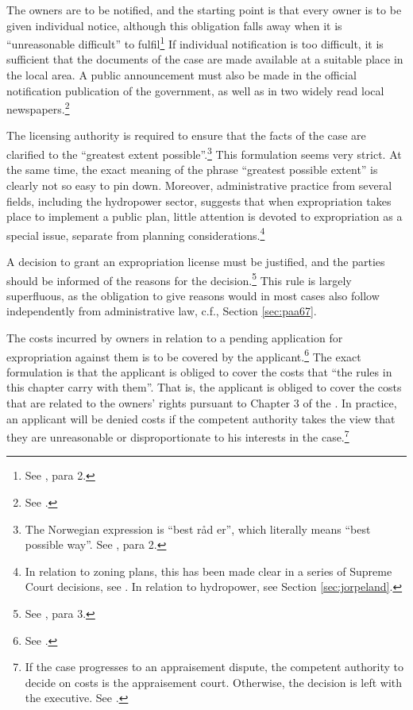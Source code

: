 The owners are to be notified, and the starting point is that every owner is to be given individual notice, although this obligation falls away when it is ``unreasonable difficult'' to fulfil\footnote{See \cite[12]{ea59}, para 2.} If individual notification is too difficult, it is sufficient that the documents of the case are made available at a suitable place in the local area. A public announcement must also be made in the official notification publication of the government, as well as in two widely read local newspapers.\footnote{See \cite[12]{ea59}.}

The licensing authority is required to ensure that the facts of the case are clarified to the ``greatest extent possible''.\footnote{The Norwegian expression is ``best råd er'', which literally means ``best possible way''. See \cite[12]{ea59}, para 2.} This formulation seems very strict. At the same time, the exact meaning of the phrase  ``greatest possible extent'' is clearly not so easy to pin down. Moreover, administrative practice from several fields, including the hydropower sector, suggests that when expropriation takes place to implement a public plan, little attention is devoted to expropriation as a special issue, separate from planning considerations.\footnote{In relation to zoning plans, this has been made clear in a series of Supreme Court decisions, see \cite{namsos98,bo99}. In relation to hydropower, see Section \ref{sec:jorpeland}.}

A decision to grant an expropriation license must be justified, and the parties should be informed of the reasons for the decision.\footnote{See \cite[12]{ea59}, para 3.} This rule is largely superfluous, as the obligation to give reasons would in most cases also follow independently from administrative law, c.f., Section \ref{sec:paa67}.

The costs incurred by owners in relation to a pending application for expropriation against them is to be covered by the applicant.\footnote{See \cite[15]{ea59}.} The exact formulation is that the applicant 
is obliged to cover the costs that ``the rules in this chapter carry with them''. That is, the applicant is obliged to cover the costs that are related to the owners' rights pursuant to Chapter 3 of the \cite{ea59}. In practice, an applicant will be denied costs if the competent authority takes the view that they are unreasonable or disproportionate to his interests in the case.\footnote{If the case progresses to an appraisement dispute, the competent authority to decide on costs is the appraisement court. Otherwise, the decision is left with the executive. See \cite[15]{ea59}.}

